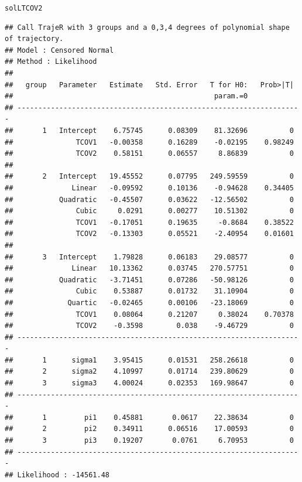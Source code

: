 \documentclass{article}\usepackage[]{graphicx}\usepackage[]{color}
\makeatletter
\newcommand{\hlstd}[1]{\textcolor[rgb]{0.345,0.345,0.345}{#1}}%
\newenvironment{kframe}{%
 \def\at@end@of@kframe{}%
 \ifinner\ifhmode%
  \def\at@end@of@kframe{\end{minipage}}%
  \begin{minipage}{\columnwidth}%
 \fi\fi%
 \def\FrameCommand##1{\hskip\@totalleftmargin \hskip-\fboxsep
 \colorbox{shadecolor}{##1}\hskip-\fboxsep
     \hskip-\linewidth \hskip-\@totalleftmargin \hskip\columnwidth}%
 \MakeFramed {\advance\hsize-\width
   \@totalleftmargin\z@ \linewidth\hsize
   \@setminipage}}%
 {\par\unskip\endMakeFramed%
 \at@end@of@kframe}
\newenvironment{knitrout}{}{} %
\makeatother
\begin{document}
\begin{knitrout}
\color{fgcolor}\begin{kframe}
\begin{alltt}
\hlstd{solLTCOV2}
\end{alltt}
\begin{verbatim}
## Call TrajeR with 3 groups and a 0,3,4 degrees of polynomial shape of trajectory.
## Model : Censored Normal
## Method : Likelihood 
##  
##   group   Parameter   Estimate   Std. Error   T for H0:   Prob>|T|  
##                                                param.=0             
## --------------------------------------------------------------------
##       1   Intercept    6.75745      0.08309    81.32696          0  
##               TCOV1   -0.00358      0.16289    -0.02195    0.98249  
##               TCOV2    0.58151      0.06557     8.86839          0  
##                                                                     
##       2   Intercept   19.45552      0.07795   249.59559          0  
##              Linear   -0.09592      0.10136    -0.94628    0.34405  
##           Quadratic   -0.45507      0.03622   -12.56502          0  
##               Cubic     0.0291      0.00277    10.51302          0  
##               TCOV1   -0.17051      0.19635     -0.8684    0.38522  
##               TCOV2   -0.13303      0.05521    -2.40954    0.01601  
##                                                                     
##       3   Intercept    1.79828      0.06183    29.08577          0  
##              Linear   10.13362      0.03745   270.57751          0  
##           Quadratic   -3.71451      0.07286   -50.98126          0  
##               Cubic    0.53887      0.01732    31.10904          0  
##             Quartic   -0.02465      0.00106   -23.18069          0  
##               TCOV1    0.08064      0.21207     0.38024    0.70378  
##               TCOV2    -0.3598        0.038    -9.46729          0  
## --------------------------------------------------------------------
##       1      sigma1    3.95415      0.01531   258.26618          0  
##       2      sigma2    4.10997      0.01714   239.80629          0  
##       3      sigma3    4.00024      0.02353   169.98647          0  
## --------------------------------------------------------------------
##       1         pi1    0.45881       0.0617    22.38634          0  
##       2         pi2    0.34911      0.06516    17.00593          0  
##       3         pi3    0.19207       0.0761     6.70953          0  
## --------------------------------------------------------------------
## Likelihood : -14561.48
\end{verbatim}
\end{kframe}
\end{knitrout}
\end{document}
